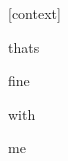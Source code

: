 \documentclass[varwidth]{standalone}
\begin{document}
\begin{CJK*}{UTF8}{gbsn}
{\setlength{\fboxsep}{0pt}\colorbox{white!0}{\parbox{0.9\textwidth}{
\colorbox{red!0.026393212378025055}{\strut [context]} \colorbox{red!1.654587745666504}{\strut thats} \colorbox{red!90.24602508544922}{\strut fine} \colorbox{red!0.053770437836647034}{\strut with} \colorbox{red!8.019233703613281}{\strut me} 
}}}
\end{CJK*}
\end{document}
